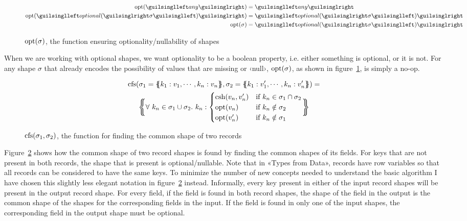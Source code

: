 \begin{figure}[ht!]
\begin{align*}
\opt(‹any›)                &= ‹any› \\
\opt(‹optional(›\sigma‹)›) &= ‹optional(›\sigma‹)› \\
\opt(\sigma)               &= ‹optional(›\sigma‹)›
\end{align*}
\caption{$\operatorname{opt}(\sigma)$, the function ensuring optionality/nullability of shapes}
\label{fig:opt}
\end{figure}

When we are working with optional shapes, we want optionality to be a boolean property, i.e. either something is optional, or it is not. For any shape $\sigma$ that already encodes the possibility of values that are missing or ‹null›, $\operatorname{opt}(\sigma)$, as shown in figure~\ref{fig:opt}, is simply a no-op.

\begin{figure}[ht!]
\begin{gather*}
\cfs(\sigma_1 = \recd{ k_1 : v_1, \cdots, k_n : v_n }, \sigma_2 = \recd{ k_1 : v'_1, \cdots, k_n : v'_n }) = \\
\recd[\bigg]{
\forall\ k_n \in \sigma_1 \cup \sigma_2 .\ k_n : \begin{cases}
  \csh(v_n, v'_n) & \text{if } k_n \in \sigma_1 \cap \sigma_2 \\
  \opt(v_n) & \text{if } k_n \notin \sigma_2 \\
  \opt(v'_n) & \text{if } k_n \notin \sigma_1
\end{cases}
}
\end{gather*}
\caption{$\operatorname{cfs}(\sigma_1, \sigma_2)$, the function for finding the common shape of two records}
\label{fig:cfs}
\end{figure}

Figure~\ref{fig:cfs} shows how the common shape of two record shapes is found by finding the common shapes of its fields. For keys that are not present in both records, the shape that is present is optional/nullable. Note that in «Types from Data», records have row variables\cite{row-types} so that all records can be considered to have the same keys. To minimize the number of new concepts needed to understand the basic algorithm I have chosen this slightly less elegant notation in figure~\ref{fig:cfs} instead. Informally, every key present in either of the input record shapes will be present in the output record shape. For every field, if the field is found in both record shapes, the shape of the field in the output is the common shape of the shapes for the corresponding fields in the input. If the field is found in only one of the input shapes, the corresponding field in the output shape must be optional.

